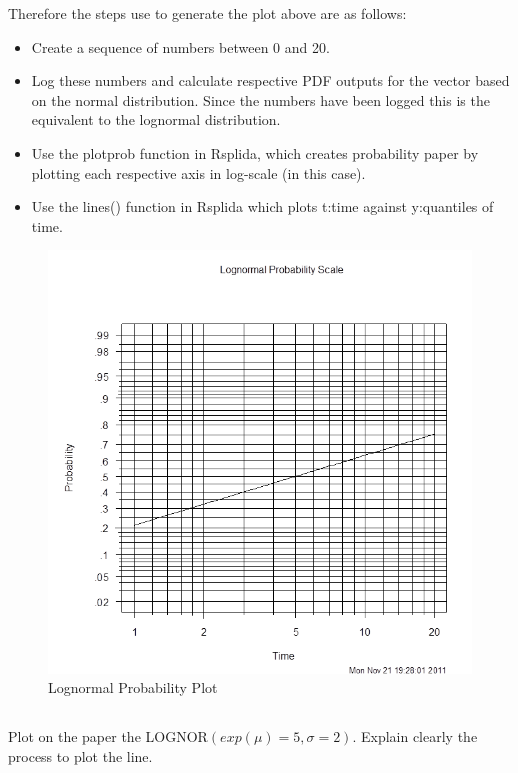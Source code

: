 \documentclass{article}
\begin{document}
Therefore the steps use to generate the plot above are as follows:\\
\begin{itemize}
\item Create a sequence of numbers between 0 and 20.\\

\item Log these numbers and calculate respective PDF outputs for the vector based on the normal distribution.  Since the numbers have been logged this is the equivalent to the lognormal distribution.

\item Use the plotprob function in Rsplida, which creates probability paper by plotting each respective axis in log-scale (in this case).

\item Use the lines() function in Rsplida which plots t:time against y:quantiles of time.
\end{itemize}


\begin{figure}
  \centering
  \includegraphics[width = 5in]{lognormal_graph_2.png}
  \caption{Lognormal Probability Plot}
\end{figure}
\FloatBarrier

\subsection{}
Plot on the paper the LOGNOR\begin{math}(exp(\mu) = 5, \sigma = 2).\end{math}
Explain clearly the process to plot the line.\\
\end{document}
